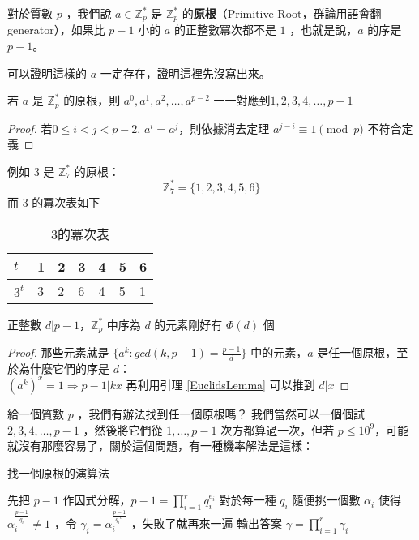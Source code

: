 \begin{definition}
對於質數 $p$ ，我們說 $a\in \mathbb Z_p^*$ 是 $\mathbb Z_p^*$ 的\textbf{原根}（Primitive Root，群論用語會翻 generator），如果比 $p-1$ 小的 $a$ 的正整數冪次都不是 $1$ ，也就是說，$a$ 的序是 $p-1$。
\end{definition}
可以證明這樣的 $a$ 一定存在，證明這裡先沒寫出來。

\begin{theorem}
若 $a$ 是 $\mathbb Z_p^*$ 的原根，則 $a^0,a^1,a^2,\ldots,a^{p-2}$ 一一對應到$1,2,3,4,\ldots,p-1$
\end{theorem}
\begin{proof}
若$0\leq i<j<p-2,\,a^i=a^j$，則依據消去定理 $a^{j-i}\equiv 1\pmod p$ 不符合定義
\end{proof}
例如 $3$ 是 $\mathbb Z_7^*$ 的原根：
$$\mathbb Z^*_7=\{1,2,3,4,5,6\}$$
而 $3$ 的冪次表如下

\begin{table}[h]
	\begin{tabularx}{\textwidth}{X | X | X | X | X| X | X }
		$t$		& 1	& 2	&3  &4  &5  &6  \\ \hline
		$3^{t}$	& 3	& 2	&6  &4  &5  &1  \\
	\end{tabularx}
	\label{tab:mod:primitive:table}
	\caption{3的冪次表}
\end{table}

\begin{theorem}
正整數 $d|p-1$，$\mathbb Z_p^*$ 中序為 $d$ 的元素剛好有 $\Phi(d)$ 個
\end{theorem}
\begin{proof}
那些元素就是 $\{a^k:gcd(k,p-1)=\frac{p-1}{d}\}$ 中的元素，$a$ 是任一個原根，至於為什麼它們的序是 $d$：\\
$(a^k)^x=1\Rightarrow p-1|kx $ 再利用引理 \ref{EuclidsLemma} 可以推到
$d|x$
\end{proof}

給一個質數 $p$ ，我們有辦法找到任一個原根嗎？
我們當然可以一個個試 $2,3,4,\ldots,p-1$ ，然後將它們從 $1,\ldots,p-1$ 次方都算過一次，但若 $p\leq 10^9$，可能就沒有那麼容易了，關於這個問題，有一種機率解法是這樣：

\begin{algorithm} \small%
	\caption{找一個原根的演算法}
	\label{alg:number:primativeRoot:findingGenerator}
	\begin{algorithmic}[1]
		\State 先把 $p-1$ 作因式分解，$p-1=\prod_{i=1}^r q_i^{e_i}$
		\State 對於每一種 $q_i$ 隨便挑一個數 $\alpha_i$ 使得 $\alpha_i^{\frac {p-1} {q_i}}\neq 1$ ，令 $\gamma_i=\alpha_i^{\frac {p-1}{{q_i}^{e_i}}}$ ，失敗了就再來一遍
		\State 輸出答案 $\gamma= \prod_{i=1}^r\gamma_i$ 
		\end{algorithmic}
\end{algorithm}

